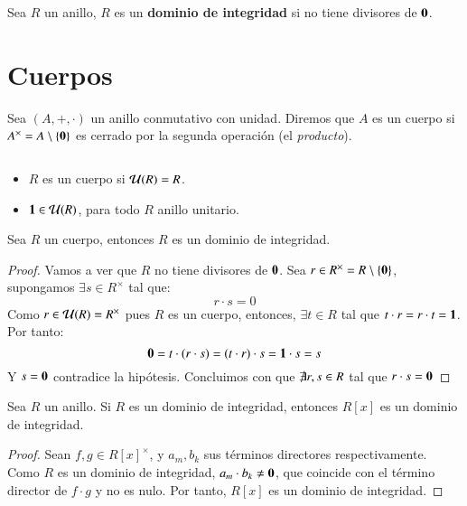 \begin{dfn}
    Sea $R$ un anillo, $R$ es un \textbf{dominio de integridad} si no tiene divisores de $\mathbf{0}$.
\end{dfn}

\section{Cuerpos}

\begin{dfn}[Cuerpo]
    Sea $(A, +, \cdot)$ un anillo conmutativo con unidad. Diremos que $A$ es un cuerpo si $A^{\times} = A\setminus \{\mathbf{0}\}$ es cerrado por la segunda operación (el \textit{producto}).
\end{dfn}

\begin{obs} $ $
    \begin{itemize}
        \item $R$ es un cuerpo si $\mathcal{U}(R) = R$.
        \item $\mathbf{1} \in \mathcal{U}(R)$, para todo $R$ anillo unitario.
    \end{itemize}
\end{obs}

\begin{pro}\label{pro:cuerpoDI}
    Sea $R$ un cuerpo, entonces $R$ es un dominio de integridad.
\end{pro}
\begin{proof}
    Vamos a ver que $R$ no tiene divisores de $\mathbf{0}$. Sea $r \in R^{\times} = R\setminus \{\mathbf{0}\}$, supongamos $\exists s \in R^{\times}$ tal que:
    $$
        r \cdot s = 0
    $$
    Como $r \in \mathcal{U}(R) = R^{\times}$ pues $R$ es un cuerpo, entonces, $\exists t \in R$ tal que $t\cdot r = r\cdot t = \mathbf{1}$. Por tanto:
    $$
        \mathbf{0} = t \cdot (r \cdot s) = (t \cdot r) \cdot s = \mathbf{1} \cdot s = s
    $$
    Y $s = \mathbf{0}$ contradice la hipótesis. Concluimos con que $\not \exists r, s \in R$ tal que $r \cdot s = \mathbf{0}$
\end{proof}

\begin{pro}
    Sea $R$ un anillo. Si $R$ es un dominio de integridad, entonces $R[x]$ es un dominio de integridad.
\end{pro}
\begin{proof}
    Sean $f, g \in R[x]^{\times}$, y $a_m, b_k$ sus términos directores respectivamente. Como $R$ es un dominio de integridad, $a_m \cdot b_k \neq \mathbf{0}$, que coincide con el término director de $f \cdot g$ y no es nulo. Por tanto, $R[x]$ es un dominio de integridad.
\end{proof}

